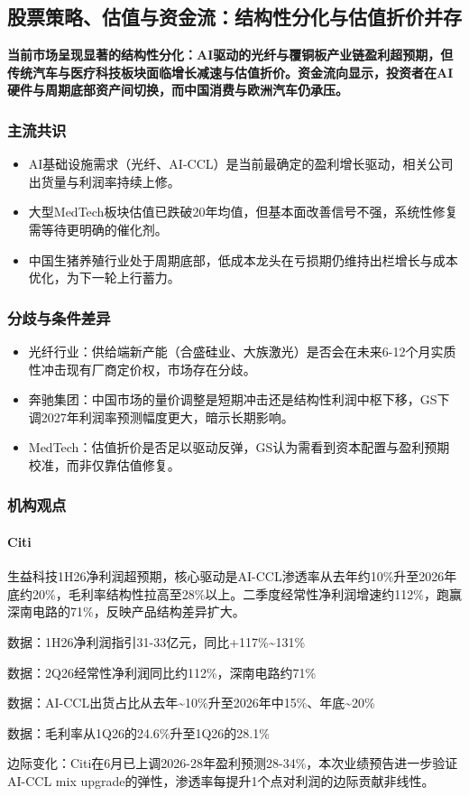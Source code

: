 \documentclass[11pt]{ctexart}
\begin{document}
\subsection{股票策略、估值与资金流：结构性分化与估值折价并存}
\textbf{当前市场呈现显著的结构性分化：AI驱动的光纤与覆铜板产业链盈利超预期，但传统汽车与医疗科技板块面临增长减速与估值折价。资金流向显示，投资者在AI硬件与周期底部资产间切换，而中国消费与欧洲汽车仍承压。}
\subsubsection*{主流共识}
\begin{itemize}
  \item AI基础设施需求（光纤、AI-CCL）是当前最确定的盈利增长驱动，相关公司出货量与利润率持续上修。
  \item 大型MedTech板块估值已跌破20年均值，但基本面改善信号不强，系统性修复需等待更明确的催化剂。
  \item 中国生猪养殖行业处于周期底部，低成本龙头在亏损期仍维持出栏增长与成本优化，为下一轮上行蓄力。
\end{itemize}
\subsubsection*{分歧与条件差异}
\begin{itemize}
  \item 光纤行业：供给端新产能（合盛硅业、大族激光）是否会在未来6-12个月实质性冲击现有厂商定价权，市场存在分歧。
  \item 奔驰集团：中国市场的量价调整是短期冲击还是结构性利润中枢下移，GS下调2027年利润率预测幅度更大，暗示长期影响。
  \item MedTech：估值折价是否足以驱动反弹，GS认为需看到资本配置与盈利预期校准，而非仅靠估值修复。
\end{itemize}
\subsubsection*{机构观点}
\paragraph{Citi} 生益科技1H26净利润超预期，核心驱动是AI-CCL渗透率从去年约10\%升至2026年底约20\%，毛利率结构性拉高至28\%以上。二季度经常性净利润增速约112\%，跑赢深南电路的71\%，反映产品结构差异扩大。
{\small\color{refgray}数据：1H26净利润指引31-33亿元，同比+117\%\textasciitilde{}131\%\par}
{\small\color{refgray}数据：2Q26经常性净利润同比约112\%，深南电路约71\%\par}
{\small\color{refgray}数据：AI-CCL出货占比从去年\textasciitilde{}10\%升至2026年中15\%、年底\textasciitilde{}20\%\par}
{\small\color{refgray}数据：毛利率从1Q26的24.6\%升至1Q26的28.1\%\par}
{\small\color{refgray}边际变化：Citi在6月已上调2026-28年盈利预测28-34\%，本次业绩预告进一步验证AI-CCL mix upgrade的弹性，渗透率每提升1个点对利润的边际贡献非线性。\par}
\end{document}
